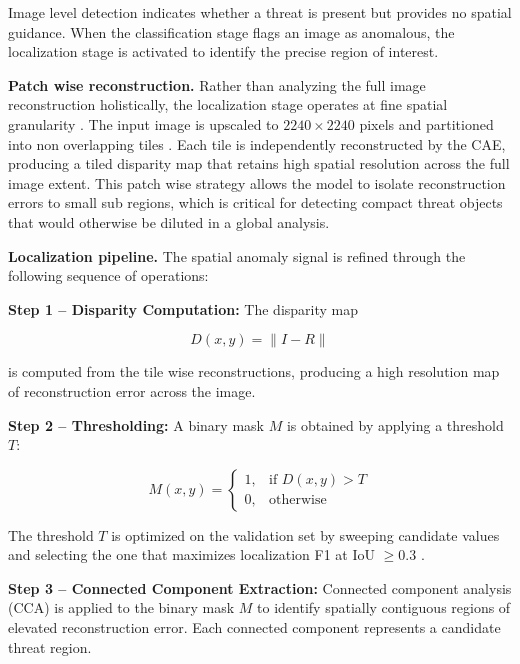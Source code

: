 \documentclass{bmvc2k}
\begin{document}
Image level detection indicates whether a threat is present but provides no spatial guidance. When the classification stage flags an image as anomalous, the localization stage is activated to identify the precise region of interest.

\textbf{Patch wise reconstruction.} Rather than analyzing the full image reconstruction holistically, the localization stage operates at fine spatial granularity \cite{patchae2023, yi2020patchsvdd}. The input image is upscaled to $2240\times2240$ pixels and partitioned into non overlapping tiles \cite{patchae2023}. Each tile is independently reconstructed by the CAE, producing a tiled disparity map that retains high spatial resolution across the full image extent. This patch wise strategy allows the model to isolate reconstruction errors to small sub regions, which is critical for detecting compact threat objects that would otherwise be diluted in a global analysis.

\textbf{Localization pipeline.} The spatial anomaly signal is refined through the following sequence of operations:

\textbf{Step 1 -- Disparity Computation:}
The disparity map

\begin{equation}
D(x,y) = \| I - R \|
\end{equation}

is computed from the tile wise reconstructions, producing a high resolution map of reconstruction error across the image.

\textbf{Step 2 -- Thresholding:}
A binary mask $M$ is obtained by applying a threshold $T$:

\begin{equation}
M(x,y) =
\begin{cases}
1, & \text{if } D(x,y) > T \\
0, & \text{otherwise}
\end{cases}
\end{equation}

The threshold $T$ is optimized on the validation set by sweeping candidate values and selecting the one that maximizes localization F1 at IoU $\geq 0.3$ \cite{bergmann2019mvtec, yi2020patchsvdd}.

\textbf{Step 3 -- Connected Component Extraction:}
Connected component analysis (CCA) is applied \cite{hassan2021unsupervised} to the binary mask $M$ to identify spatially contiguous regions of elevated reconstruction error. Each connected component represents a candidate threat region.
\end{document}
